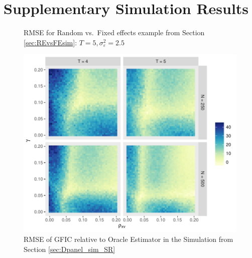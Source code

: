 \section{Supplementary Simulation Results}
\label{sec:simulation_supplement}

\begin{figure}[H]
  \centering
  
  \caption{RMSE for Random vs.\ Fixed effects example from Section \ref{sec:REvsFEsim}: $T=5, \sigma_{\varepsilon}^2 = 2.5$}
  \label{fig:REvsFE_T5}
\end{figure}
\begin{figure}
\centering
\includegraphics[scale = 0.8]{./simulations/DynamicPanel/results/Dpanel_GFIC_RMSE_rel_oracle}
\caption{RMSE of GFIC relative to Oracle Estimator in the Simulation from Section \ref{sec:Dpanel_sim_SR}}
\end{figure}

